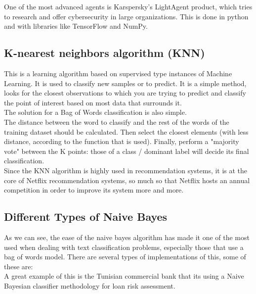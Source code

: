 \documentclass[sigconf,12pt,review=false,natbib=false]{acmart}
\begin{document}
One of the most advanced agents is Karspersky's LightAgent product, which tries to research and offer cybersecurity
in large organizations. This is done in python and with libraries like TensorFlow and NumPy. \\

\subsection{K-nearest neighbors algorithm (KNN)}

This is a learning algorithm based on supervised type instances of Machine Learning. It is used to classify new samples
or to predict. It is a simple method, looks for the closest observations to which you are trying to predict and classify
the point of interest based on most data that surrounds it. \\

The solution for a Bag of Words classification is also simple. \\

The distance between the word to classify and the rest of the words of the training dataset should be calculated. Then
select the closest elements (with less distance, according to the function that is used). Finally, perform a "majority
vote" between the K points: those of a class / dominant label will decide its final classification. \\

Since the KNN algorithm is highly used in recommendation systems, it is at the core of Netflix recommendation systems,
so much so that Netflix hosts an annual competition in order to improve its system more and more. \\

\subsection{Different Types of Naive Bayes}

As we can see, the ease of the naive bayes algorithm has made it one of the most used when dealing
with text classification problems, especially those that use a bag of words model. There are several types of
implementations of this, some of these are:\\

A great example of this is the Tunisian commercial bank that its using a Naive Bayesian classifier methodology
for loan risk assessment. \\
\end{document}
